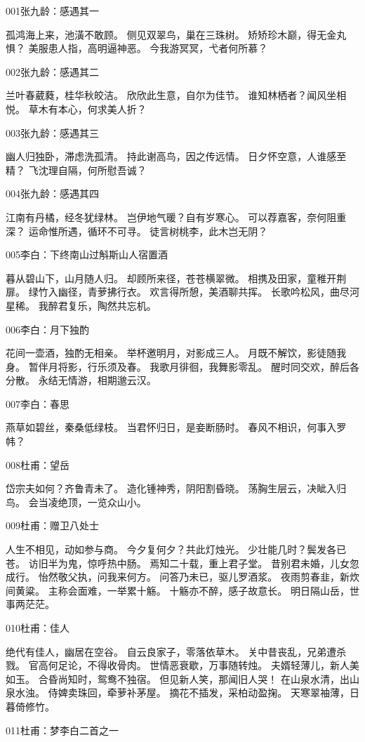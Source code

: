 001张九龄：感遇其一

孤鸿海上来，池潢不敢顾。
侧见双翠鸟，巢在三珠树。
矫矫珍木巅，得无金丸惧？
美服患人指，高明逼神恶。
今我游冥冥，弋者何所慕？

002张九龄：感遇其二

兰叶春葳蕤，桂华秋皎洁。
欣欣此生意，自尔为佳节。
谁知林栖者？闻风坐相悦。
草木有本心，何求美人折？

003张九龄：感遇其三

幽人归独卧，滞虑洗孤清。
持此谢高鸟，因之传远情。
日夕怀空意，人谁感至精？
飞沈理自隔，何所慰吾诚？

004张九龄：感遇其四

江南有丹橘，经冬犹绿林。
岂伊地气暖？自有岁寒心。
可以荐嘉客，奈何阻重深？
运命惟所遇，循环不可寻。
徒言树桃李，此木岂无阴？

005李白：下终南山过斛斯山人宿置酒

暮从碧山下，山月随人归。
却顾所来径，苍苍横翠微。
相携及田家，童稚开荆扉。
绿竹入幽径，青萝拂行衣。
欢言得所憩，美酒聊共挥。
长歌吟松风，曲尽河星稀。
我醉君复乐，陶然共忘机。


006李白：月下独酌

花间一壶酒，独酌无相亲。
举杯邀明月，对影成三人。
月既不解饮，影徒随我身。
暂伴月将影，行乐须及春。
我歌月徘徊，我舞影零乱。
醒时同交欢，醉后各分散。
永结无情游，相期邈云汉。

007李白：春思

燕草如碧丝，秦桑低绿枝。
当君怀归日，是妾断肠时。
春风不相识，何事入罗帏？ 	

008杜甫：望岳

岱宗夫如何？齐鲁青未了。
造化锺神秀，阴阳割昏晓。
荡胸生层云，决眦入归鸟。
会当凌绝顶，一览众山小。

009杜甫：赠卫八处士

人生不相见，动如参与商。
今夕复何夕？共此灯烛光。
少壮能几时？鬓发各已苍。
访旧半为鬼，惊呼热中肠。
焉知二十载，重上君子堂。
昔别君未婚，儿女忽成行。
怡然敬父执，问我来何方。
问答乃未已，驱儿罗酒浆。
夜雨剪春韭，新炊间黄粱。
主称会面难，一举累十觞。
十觞亦不醉，感子故意长。
明日隔山岳，世事两茫茫。

010杜甫：佳人

绝代有佳人，幽居在空谷。
自云良家子，零落依草木。
关中昔丧乱，兄弟遭杀戮。
官高何足论，不得收骨肉。
世情恶衰歇，万事随转烛。
夫婿轻薄儿，新人美如玉。
合昏尚知时，鸳鸯不独宿。
但见新人笑，那闻旧人哭！
在山泉水清，出山泉水浊。
侍婢卖珠回，牵萝补茅屋。
摘花不插发，采柏动盈掬。
天寒翠袖薄，日暮倚修竹。

011杜甫：梦李白二首之一

